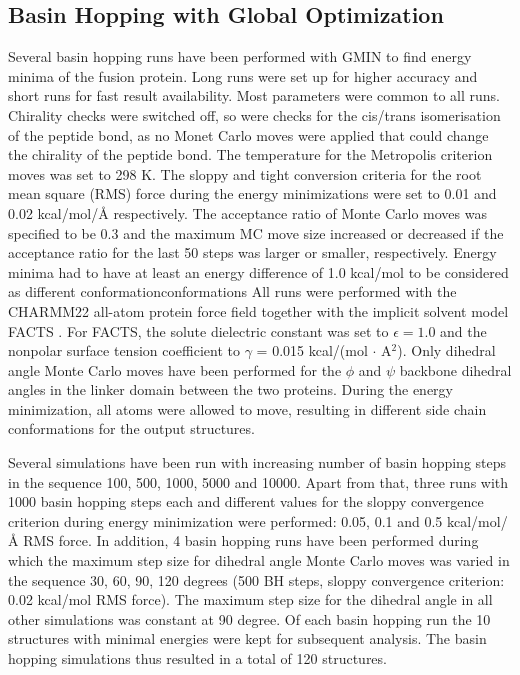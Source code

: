 \documentclass[english, a4paper, 12pt, titlepage, draft]{article}
\begin{document}
\subsection{Basin Hopping with Global Optimization}
\label{sec:GMIN}

Several basin hopping runs have been performed with GMIN to find energy minima of the fusion protein.
Long runs were set up for higher accuracy and short runs for fast result availability.
Most parameters were common to all runs.
Chirality checks were switched off, so were checks for the cis/trans isomerisation of the peptide bond, as no Monet Carlo moves were applied that could change the chirality of the peptide bond.
The temperature for the Metropolis criterion moves was set to 298 K.
The sloppy and tight conversion criteria for the root mean square (RMS) force during the energy minimizations were set to 0.01 and 0.02 kcal/mol/\r{A} respectively.
The acceptance ratio of Monte Carlo moves was specified to be 0.3 and the maximum MC move size increased or decreased if the acceptance ratio for the last 50 steps was larger or smaller, respectively.
Energy minima had to have at least an energy difference of 1.0 kcal/mol to be considered as different conformationconformations
All runs were performed with the CHARMM22 all-atom protein force field \cite{CHARMM22} together with the implicit solvent model FACTS \cite{FACTS}.
For FACTS, the solute dielectric constant was set to $\epsilon = 1.0$ and the nonpolar surface tension coefficient to $\gamma$ = 0.015 kcal/(mol $\cdot$ A$^2$).
Only dihedral angle Monte Carlo moves have been performed for the $\phi$ and $\psi$ backbone dihedral angles in the linker domain between the two proteins.
During the energy minimization, all atoms were allowed to move, resulting in different side chain conformations for the output structures.

Several simulations have been run with increasing number of basin hopping steps in the sequence 100, 500, 1000, 5000 and 10000.
Apart from that, three runs with 1000 basin hopping steps each and different values for the sloppy convergence criterion during energy minimization were performed: 0.05, 0.1 and 0.5 kcal/mol/\r{A} RMS force.
In addition, 4 basin hopping runs have been performed during which the maximum step size for dihedral angle Monte Carlo moves was varied in the sequence 30, 60, 90, 120 degrees (500 BH steps, sloppy convergence criterion: 0.02 kcal/mol RMS force).
The maximum step size for the dihedral angle in all other simulations was constant at 90 degree.
Of each basin hopping run the 10 structures with minimal energies were kept for subsequent analysis.
The basin hopping simulations thus resulted in a total of 120 structures.
\end{document}
